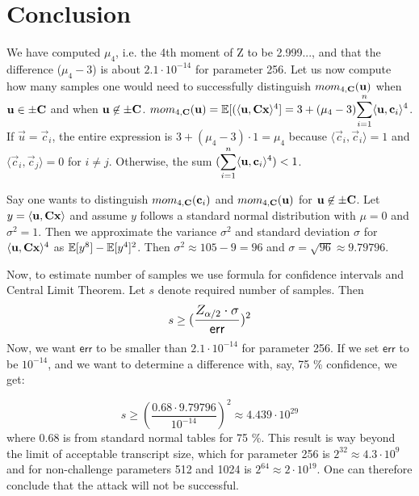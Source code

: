 \section{Conclusion}
We have computed $\mu_4$, i.e. the 4th moment of Z to be 2.999..., and that the difference ($\mu_4 - 3$) is about $2.1 \cdot 10^{-14}$ for parameter 256.
Let us now compute how many samples one would need to successfully distinguish $mom_{4, \mathbf{C}}(\mathbf{u})$ when $\mathbf{u} \in \pm \mathbf{C}$ and when $\mathbf{u} \not\in\pm\mathbf{C}$.
$mom_{4, \mat{C}}(\vec{u}) = \bb{E}[(\langle \vec{u}, \mat{C}\vec{x} \rangle ^4] = 3 + (\mu_4 - 3) \mathlarger{\sum_{i=1}^{n} \langle \vec{u}, \vec{c}_i \rangle ^4}$.
If $\vec{u} = \vec{c}_i$, the entire expression is $3 + (\mu_4 - 3)\cdot 1 = \mu_4$ because $\langle \vec{c}_i, \vec{c}_i \rangle = 1$ and $\langle \vec{c}_i, \vec{c}_j \rangle = 0$ for $i \neq j$. 
Otherwise, the sum $(\mathlarger{\sum_{i=1}^{n} \langle \vec{u}, \vec{c}_i \rangle ^4}) < 1$.


Say one wants to distinguish $mom_{4, \mathbf{C}}(\mathbf{c}_i)$ and $mom_{4, \mathbf{C}}(\mathbf{u})$ for $\mathbf{u} \not\in\pm\mathbf{C}$.
Let $y = \langle \mathbf{u}, \mathbf{C} \mathbf{x} \rangle$ and assume $y$ follows a standard normal distribution with $\mu = 0$ and $\sigma^2 = 1$.
Then we approximate the variance $\sigma^2$ and standard deviation $\sigma$ for $\langle \mathbf{u}, \mathbf{C}\mathbf{x} \rangle ^4$ as $\mathbb{E}[y^8] - \mathbb{E}[y^4]^2$.
Then $\sigma^2 \approx 105 - 9 = 96$ and $\sigma = \sqrt{96} \approx 9.79796$.

Now, to estimate number of samples we use formula for confidence intervals and Central Limit Theorem. Let $s$ denote required number of samples. Then 
\[
    s \geq \mathlarger{(\frac{Z_{\alpha/2} \cdot \sigma}{\mathsf{err}})^2}
\]
Now, we want $\mathsf{err}$ to be smaller than $2.1 \cdot 10^{-14}$ for parameter 256.
If we set $\mathsf{err}$ to be $10^{-14}$, and we want to determine a difference with, say, 75 \% confidence, we get:

\[
    s \geq (\frac{0.68 \cdot 9.79796}{10^{-14}})^2 \approx 4.439 \cdot 10^{29}
\]
where $0.68$ is from standard normal tables for 75 \%.
This result is way beyond the limit of acceptable transcript size, which for parameter 256 is $2^{32} \approx 4.3 \cdot 10^{9}$ and for non-challenge parameters 512 and 1024 is $2^{64} \approx 2 \cdot 10^{19}$.
One can therefore conclude that the attack will not be successful.
